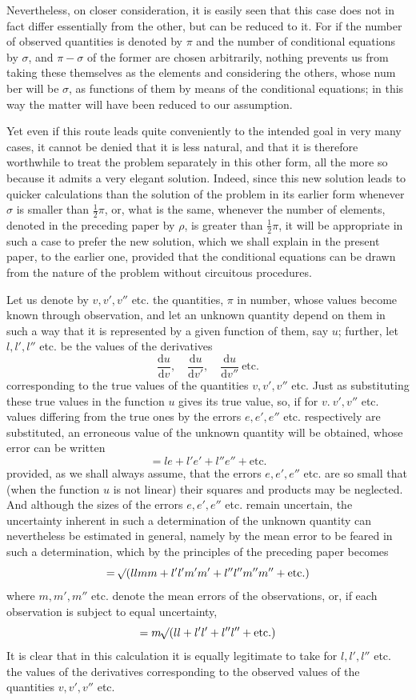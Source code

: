 Nevertheless, on closer consideration, it is easily seen that this case does not in fact differ essentially from the other, but can be reduced to it. For if the number of observed quantities is denoted by \(\pi\) and the number of conditional equations by \(\sigma\), and \(\pi-\sigma\) of the former are chosen arbitrarily, nothing prevents us from taking these themselves as the elements and considering the others, whose num%
ber will be \(\sigma\), as functions of them by means of the conditional equations; in this way the matter will have been reduced to our assumption.

Yet even if this route leads quite conveniently to the intended goal in very many cases, it cannot be denied that it is less natural, and that it is therefore worthwhile to treat the problem separately in this other form, all the more so because it admits a very elegant solution. Indeed, since this new solution leads to quicker calculations than the solution of the problem in its earlier form whenever \(\sigma\) is smaller than \(\frac12\pi\), or, what is the same, whenever the number of elements, denoted in the preceding paper by \(\rho\), is greater than \(\frac12\pi\), it will be appropriate in such a case to prefer the new solution, which we shall explain in the present paper, to the earlier one, provided that the conditional equations can be drawn from the nature of the problem without circuitous procedures.

Let us denote by \(v,v',v''\) etc. the quantities, \(\pi\) in number, whose values become known through observation, and let an unknown quantity depend on them in such a way that it is represented by a given function of them, say \(u\); further, let \(l,l',l''\) etc. be the values of the derivatives
\[
\frac{\mathrm du}{\mathrm dv},\quad \frac{\mathrm du}{\mathrm dv'},\quad \frac{\mathrm du}{\mathrm dv''}\ \text{etc.}
\]
corresponding to the true values of the quantities \(v,v',v''\) etc. Just as substituting these true values in the function \(u\) gives its true value, so, if for \(v.\ v',v''\) etc. values differing from the true ones by the errors \(e,e',e''\) etc. respectively are substituted, an erroneous value of the unknown quantity will be obtained, whose error can be written
\[
=le+l'e'+l''e''+\text{etc.}
\]
provided, as we shall always assume, that the errors \(e,e',e''\) etc. are so small that (when the function \(u\) is not linear) their squares and products may be neglected. And although the sizes of the errors \(e,e',e''\) etc. remain uncertain, the uncertainty inherent in such a determination of the unknown quantity can nevertheless be estimated in general, namely by the mean error to be feared in such a determination, which by the principles of the preceding paper becomes
\[
=\mathord{{}^{}\!\surd}(llmm+l'l'm'm'+l''l''m''m''+\text{etc.})
\]
%
where \(m,m',m''\) etc. denote the mean errors of the observations, or, if each observation is subject to equal uncertainty,
\[
=m\mathord{{}^{}\!\surd}(ll+l'l'+l''l''+\text{etc.})
\]
It is clear that in this calculation it is equally legitimate to take for \(l,l',l''\) etc. the values of the derivatives corresponding to the observed values of the quantities \(v,v',v''\) etc.

\clearpage
